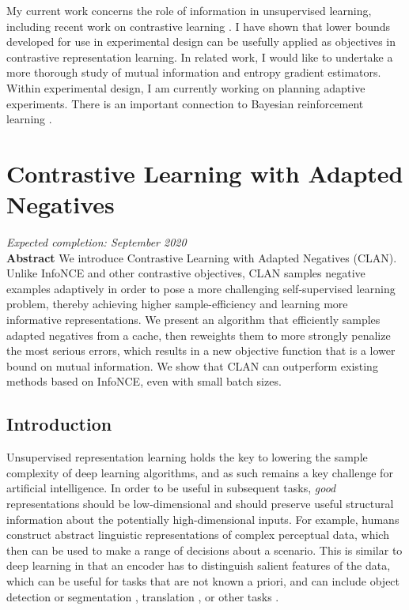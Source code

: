 My current work concerns the role of information in unsupervised learning, including recent work on contrastive learning \cite{chen2020simple}. I have shown that lower bounds developed for use in experimental design can be usefully applied as objectives in contrastive representation learning. In related work, I would like to undertake a more thorough study of mutual information and entropy gradient estimators. Within experimental design, I am currently working on planning adaptive experiments. There is an important connection to Bayesian reinforcement learning \cite{zintgraf2019varibad}.


\section{Contrastive Learning with Adapted Negatives}
\textit{Expected completion: September 2020} \\
\textbf{Abstract} We introduce Contrastive Learning with Adapted Negatives (CLAN). Unlike InfoNCE and other contrastive objectives, CLAN samples negative examples adaptively in order to pose a more challenging self-supervised learning problem, thereby achieving higher sample-efficiency and learning more informative representations. We present an algorithm that efficiently samples adapted negatives from a cache, then reweights them to more strongly penalize the most serious errors, which results in a new objective function that is a lower bound on mutual information. We show that CLAN can outperform existing methods based on InfoNCE, even with small batch sizes.

\subsection{Introduction}
Unsupervised representation learning holds the key to lowering the sample complexity of deep learning algorithms, and as such remains a key challenge for artificial intelligence.
In order to be useful in subsequent tasks, \textit{good} representations should be low-dimensional and should preserve useful structural information about the potentially high-dimensional inputs.
For example, humans construct abstract linguistic representations of complex perceptual data, which then can be used to make a range of decisions about a scenario.
This is similar to deep learning in that an encoder has to distinguish salient features of the data, which can be useful for tasks that are not known a priori, and can include object detection or segmentation \cite{he2019momentum}, translation \cite{devlin2018bert}, or other tasks \cite{oord2018representation}.

